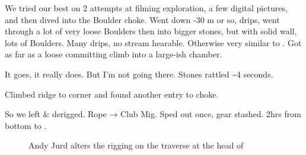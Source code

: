 We tried our best on 2 attempts at filming exploration, a few digital
pictures, and then dived into the Boulder choke. Went down -30 m or so,
drips, went through a lot of very loose Boulders then into bigger
stones, but with solid wall, lots of Boulders. Many drips, no stream
hearable. Otherwise very similar to . Got as far as
a loose committing climb into a large-ish chamber.

It goes, it really does. But I'm not going there. Stones rattled
\textasciitilde 4 seconds.

Climbed ridge to corner and found another entry to choke.

So we left \& derigged. Rope → Club Mig. Sped out once, gear stashed.
2hrs from bottom to .



\begin{figure}
\checkoddpage \ifoddpage \forcerectofloat \else \forceversofloat \fi
\centering
 \caption{Andy Jurd alters the rigging on the traverse at the head of \protect{} }
 \label{Plopzilla traverse}
\end{figure}
